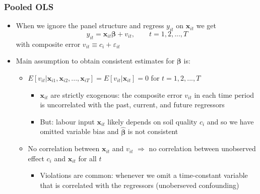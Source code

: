 \documentclass[xcolor=svgnames,9pt,english, aspectratio=169]{beamer}
\newcommand{\bs}{\boldsymbol}
\newcommand{\mb}{\mathbf}
\newcommand{\x}{\ensuremath{\mb{x}}}
\renewcommand{\b}{\ensuremath{\bs{\beta}}}
\newcommand{\bhat}{\ensuremath{\hat{\bs{\beta}}}}
\begin{document}
\begin{frame}
  \frametitle{Pooled OLS}
  \small
\begin{itemize}
\item When we ignore the panel structure and regress $y_{it}$ on $\x_{it}$ we get
\[
y_{it} = \x_{it}\b + v_{it}, \quad \quad t=1,2,...,T
\]
with \alert{composite error} $v_{it} \equiv c_i + \varepsilon_{it}$\medskip
\item Main assumption to obtain consistent estimates for $\b$ is:\medskip\pause
 \begin{itemize}
   \item $E[v_{it}|\x_{i1},\x_{i2},...,\x_{iT}]=E[v_{it}|\x_{it}]=0$ for $t=1,2,...,T$
   \begin{itemize}
    \item $\x_{it}$ are \alert{strictly exogenous}: the composite error $v_{it}$ in each time period is uncorrelated with the past, current, and future regressors
    \item But: labour input $\x_{it}$ likely depends on soil quality $c_i$ and so we have omitted variable bias and $\bhat$ is not consistent
    \end{itemize}\medskip\pause
 \item No correlation between $\x_{it}$ and $v_{it}$ $\Rightarrow$ no correlation between unobserved effect $c_{i}$ and $\x_{it}$ for all $t$
 \begin{itemize}
   \item Violations are common: whenever we omit a time-constant variable that is correlated with the regressors (\alert{unoberseved confounding})
 \end{itemize}
 \end{itemize}
\end{itemize}
\end{frame}
\end{document}
